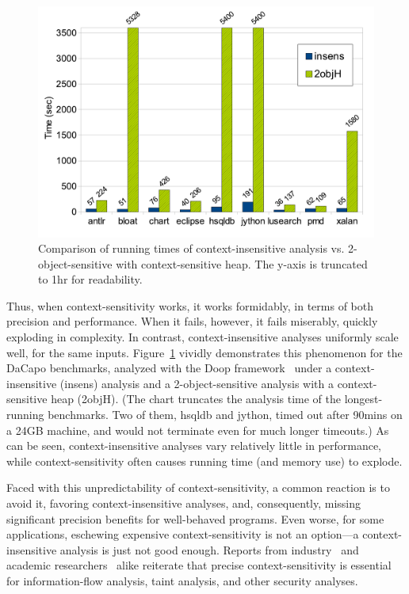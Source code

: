 \begin{figure}[tbp]
\begin{center}
\hspace{-2mm}\includegraphics[scale=0.42]{assets/introspective/intro-chart.pdf}
\end{center}
\vspace{-0.6cm}
\caption{Comparison of running times of context-insensitive analysis vs.
  2-object-sensitive with context-sensitive heap. The y-axis is
  truncated to 1hr for readability.}
\label{intro-chart}
\end{figure}

Thus, when context-sensitivity works, it works formidably, in terms of
both precision and performance. When it fails, however, it fails
miserably, quickly exploding in complexity. In contrast,
context-insensitive analyses uniformly scale well, for the same
inputs. Figure~\ref{intro-chart} vividly demonstrates this phenomenon
for the DaCapo benchmarks, analyzed with the Doop
framework~\cite{BS-OOPSLA09} under a context-insensitive (insens)
analysis and a 2-object-sensitive analysis with a context-sensitive
heap (2objH). (The chart truncates the analysis time of the
longest-running benchmarks. Two of them, hsqldb and jython, timed out
after 90mins on a 24GB machine, and would not terminate even for much
longer timeouts.) As can be seen, context-insensitive analyses vary
relatively little in performance, while context-sensitivity often
causes running time (and memory use) to explode.

Faced with this unpredictability of context-sensitivity, a
common reaction is to avoid it, favoring context-insensitive analyses,
and, consequently, missing significant precision benefits for
well-behaved programs. Even worse, for some applications, eschewing
expensive context-sensitivity is not an option---a context-insensitive
analysis is just not good enough.
Reports from industry~\cite{cifuentes} and academic
researchers~\cite{chong} alike reiterate that precise
context-sensitivity is essential for information-flow analysis, taint analysis,
and other security analyses.

